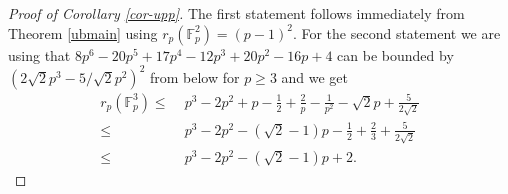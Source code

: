 \documentclass[12pt]{amsart}
\newcommand{\<}{\langle}
\renewcommand{\>}{\rangle}
\numberwithin{equation}{section}
\numberwithin{theorem}{section}
\begin{document}
\begin{proof}[Proof of Corollary \ref{cor-upp}]
The first statement follows immediately from Theorem \ref{ubmain} using $r_p(\mathbb{F}_p^2)=(p-1)^2$. For the second statement we are using that $8p^6-20p^5+17p^4-12p^3+20p^2-16p+4$ can be bounded by $(2\sqrt{2}p^3-5/\sqrt{2}p^2)^2$ from below for $p\geq 3$ and we get 
\begin{equation*}
\begin{split}   
r_p(\mathbb{F}_p^3)\leq & \; p^3-2p^2+p-\frac{1}{2}+\frac{2}{p}-\frac{1}{p^2}-\sqrt{2}p+\frac{5}{2 \sqrt{2}} \\ \leq & \;  p^3-2p^2-(\sqrt{2}-1)p-\frac{1}{2}+\frac{2}{3}+\frac{5}{2 \sqrt{2}} \\ \leq  & \; p^3-2p^2-(\sqrt{2}-1)p+2.
\end{split}
\end{equation*}
\end{proof}
\end{document}
